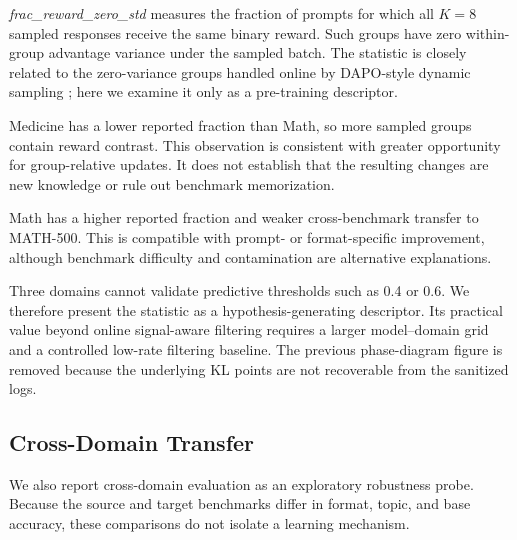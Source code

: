 \documentclass[11pt]{article}
\begin{document}
\textit{frac\_reward\_zero\_std} measures the fraction of prompts for which all $K=8$ sampled responses receive the same binary reward. Such groups have zero within-group advantage variance under the sampled batch. The statistic is closely related to the zero-variance groups handled online by DAPO-style dynamic sampling \citep{yu2025dapo}; here we examine it only as a pre-training descriptor.

Medicine has a lower reported fraction than Math, so more sampled groups contain reward contrast. This observation is consistent with greater opportunity for group-relative updates. It does not establish that the resulting changes are new knowledge or rule out benchmark memorization.

Math has a higher reported fraction and weaker cross-benchmark transfer to MATH-500. This is compatible with prompt- or format-specific improvement, although benchmark difficulty and contamination are alternative explanations.

Three domains cannot validate predictive thresholds such as 0.4 or 0.6. We therefore present the statistic as a hypothesis-generating descriptor. Its practical value beyond online signal-aware filtering requires a larger model--domain grid and a controlled low-rate filtering baseline. The previous phase-diagram figure is removed because the underlying KL points are not recoverable from the sanitized logs.

\subsection{Cross-Domain Transfer}
\label{sec:cross_domain}

We also report cross-domain evaluation as an exploratory robustness probe. Because the source and target benchmarks differ in format, topic, and base accuracy, these comparisons do not isolate a learning mechanism.
\end{document}
